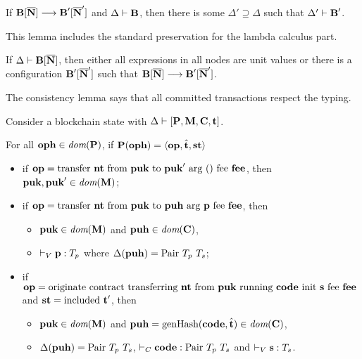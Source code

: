 \documentclass[a4paper]{llncs}
\begin{document}
\begin{lemma}[Preservation]
  If $\BLOCKCHAIN[\overline\NODE] \SystemTrans{} \BLOCKCHAIN'[\overline\NODE']$ and
  $\JTypeBlockchain\Delta \BLOCKCHAIN$, then there is some
  $\Delta' \supseteq \Delta$ such that
  $\JTypeBlockchain{\Delta'}{ \BLOCKCHAIN'}$.
\end{lemma}
This lemma includes the standard preservation for the lambda calculus part.
\begin{lemma}[Progress]
  If $\JTypeConfig\Delta{\BLOCKCHAIN[\overline\NODE]}$, then either
  all expressions in all nodes are unit values or there is a
  configuration $\BLOCKCHAIN'[\overline\NODE']$ such that
  $\BLOCKCHAIN[\overline\NODE] \SystemTrans \BLOCKCHAIN'[\overline\NODE']$.
\end{lemma}
The consistency lemma says that all committed transactions respect the
typing.
\begin{lemma}[Consistency]
Consider a blockchain state with $\JTypeBlockchain\Delta {[\PENDING, \MANAGERS, \CONTRACTORS,
\TIME]}$.

For all $\OPH\in\DOM (\PENDING)$,
if  $\PENDING (\OPH) =  \Angle{\OP, \hat\TIME, \STATUS}$
\begin{itemize}
\item if $\OP = \TRANSFER\NTEZ\PUK{\PUK'}\MTEZ$, then
  $\PUK, \PUK' \in \DOM (\MANAGERS)$;
\item if $\OP = \TRANSFER[\PARAMETER]\NTEZ\PUK\PUH\MTEZ$, then
  \begin{itemize}
  \item $\PUK \in \DOM (\MANAGERS)$ and $\PUH\in\DOM (\CONTRACTORS)$,
  \item $\JTypeValue\PARAMETER{ \TYPE_p}$ where $\Delta (\PUH)  =\TPAIR\ \TYPE_p\ \TYPE_s$;
  \end{itemize}
\item if $\OP = \ORIGINATE\NTEZ\PUK\CODE\STRING\MTEZ$ and $\STATUS =
  \STATUSINCLUDED\ \TIME'$, then
  \begin{itemize}
  \item $\PUK \in \DOM (\MANAGERS)$ and  $\PUH =\GENERATEHASH (\CODE, \hat\TIME) \in \DOM (\CONTRACTORS)$,
  \item $\Delta (\PUH)  =\TPAIR\ \TYPE_p\ \TYPE_s$,  $\JTypeCode\CODE{
      \TPAIR\ \TYPE_p\ \TYPE_s}$ and $\JTypeValue\STRING{ \TYPE_s}$.
  \end{itemize}
\end{itemize}
\end{lemma}
\end{document}
